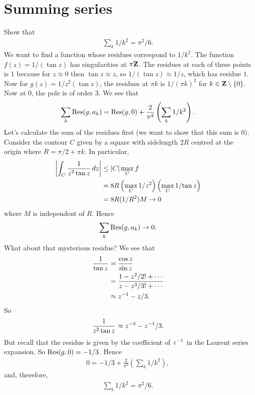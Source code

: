 \documentclass[11pt, oneside,margin=1in]{article}
\begin{document}
\section{Summing series}
\begin{example}\label{}\text{}
Show that
\begin{align*}
	\sum_k 1/k^2 = \pi^2/6.
\end{align*}
We want to find a function whose residues correspond to $1/k^2$. The function $f(z) = 1/ (\tan z)$ has singularities at $\pi \mathbf Z$. The residues at each of these points is $1$ because for $z\approx 0$ then $\tan z \approx z$, so $1/(\tan z)\approx 1/z$, which has residue $1$. Now for $g(z) = 1/z^2 (\tan z)$, the residues at $\pi k$ is $1/(\pi k)^2$ for $k \in \mathbf Z\setminus \{0\}$. Now at $0$, the pole is of order $3$. We see that
\begin{align*}
	\sum_k \operatorname{Res}(g,a_k) = \operatorname{Res}(g,0) + \frac{2}{\pi^2} \left( \sum_k 1/k^2 \right).
\end{align*}
Let's calculate the sum of the residues first (we want to show that this sum is $0$). Consider the contour $C$ given by a square with sidelength $2R$ centred at the origin where $R = \pi/2 + \pi k$. In particular, 
 \begin{align*}
	 \left \lvert \int_C \frac{1}{z^2\tan z} \, dz \right \rvert &\le \left \lvert C \right \rvert \max_C f\\
						&= 8R\left (\max_C {1}/{z^2}\right) \left(\max_C {1}/{\tan z}\right)\\
						&= 8R(1/R^2)M \to 0
\end{align*}
where $M$ is independent of $R$. Hence
\begin{align*}
	\sum_{k} \operatorname{Res}(g,a_k) \to 0.
\end{align*}
What about that mysterious residue? We see that
\begin{align*}
	\frac{1}{\tan z} &= \frac{\cos z}{\sin z}\\ &= \frac{ 1 - z^2/2! + \cdots}{z - z^3/3! + \cdots}\\
			 &\approx z^{-1} - z/3.
\end{align*}
So 
\begin{align*}
	\frac{1}{z^2\tan z} \approx z^{-3} - z^{-1} / 3.
\end{align*}
But recall that the residue is given by the coefficient of $z^{-1}$ in the Laurent series expansion. So $\operatorname{Res} (g,0) = -1/3$. Hence
\begin{align*}
	0 = -1/3 + \frac{2}{\pi^2} \left(\sum_k 1/k^2\right),
\end{align*}
and, therefore,
\begin{align*}
	\sum_k 1/k^2 = \pi^2/6.
\end{align*}
\end{example}
\end{document}
